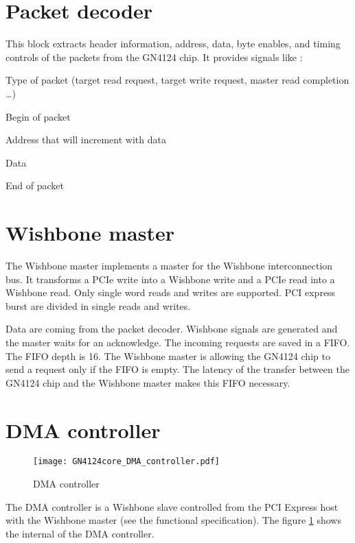 \documentclass[10pt,a4paper]{cerndoc}
\begin{document}
  \section{Packet decoder}
    This block extracts header information, address, data, byte enables, and timing controls of the packets from the GN4124 chip. It provides signals like :
\begin{packed_item}
  \item Type of packet (target read request, target write request, master read completion \dots) 
  \item Begin of packet  
  \item Address that will increment with data
  \item Data
  \item End of packet   
\end{packed_item}

\section{Wishbone master}
  The Wishbone master implements a master for the Wishbone interconnection bus. It transforms a PCIe write into a Wishbone write and a PCIe read into a Wishbone read. Only single word reads and writes are supported. PCI express burst are divided in single reads and writes.
  
  Data are coming from the packet decoder. Wishbone signals are generated and the master waits for an acknowledge. The incoming requests are saved in a FIFO. The FIFO depth is 16. The Wishbone master is allowing the GN4124 chip to send a request only if the FIFO is empty. The latency of the transfer between the GN4124 chip and the Wishbone master makes this FIFO necessary.



\section{DMA controller}
  
\begin{figure}[!ht]
  \centering
  \texttt{[image: GN4124core\_DMA\_controller.pdf]}
  \caption{DMA controller}
  \label{fig:GN4124core_dma_ctrl}
\end{figure}
  
The DMA controller is a Wishbone slave controlled from the PCI Express host with the Wishbone master (see the functional specification). The figure \ref{fig:GN4124core_dma_ctrl} shows the internal of the DMA controller.
\end{document}
